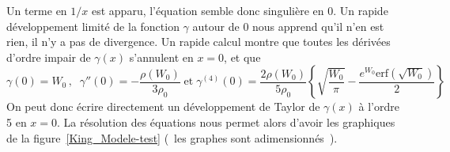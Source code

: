 	Un terme en $1/x$ est apparu, l'équation semble donc singulière en $0$. Un rapide
	développement limité de la fonction $\gamma$ autour de $0$ nous apprend qu'il n'en est rien, il n'y a
	pas de divergence. Un rapide calcul montre que toutes les dérivées d'ordre impair de $\gamma(x)$ s'annulent en $x=0$, et que 
	$$
	\gamma(0) = W_0\, ,\;\; \gamma''(0) = -\frac{\rho(W_0)}{3\rho_0}\; \mathrm{et}\; \gamma^{(4)}(0) = \frac{2\rho(W_0)}{5\rho_0}\left\{\sqrt{\frac{W_0}{\pi}} -
			\frac{e^{W_0}\mathrm{erf}(\sqrt{W_0})}{2}\right\} 
	$$
On peut donc écrire directement un développement de Taylor de $\gamma(x)$ à l'ordre 5 en $x=0$. 
	La résolution des équations nous permet alors d'avoir les graphiques de la
	figure~\ref{King_Modele-test} (~les graphes sont adimensionnés~).%


